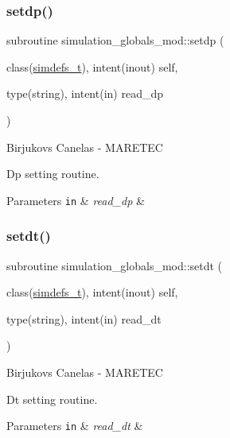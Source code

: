 \subsubsection{\texorpdfstring{setdp()}{setdp()}}
{\footnotesize\ttfamily subroutine simulation\+\_\+globals\+\_\+mod\+::setdp (\begin{DoxyParamCaption}\item[{class(\hyperlink{structsimulation__globals__mod_1_1simdefs__t}{simdefs\+\_\+t}), intent(inout)}]{self,  }\item[{type(string), intent(in)}]{read\+\_\+dp }\end{DoxyParamCaption})\hspace{0.3cm}{\ttfamily [private]}}



Birjukovs Canelas -\/ M\+A\+R\+E\+T\+EC 

Dp setting routine. 
\begin{DoxyParams}[1]{Parameters}
\mbox{\tt in}  & {\em read\+\_\+dp} & \\
\hline
\end{DoxyParams}
\mbox{\label{namespacesimulation__globals__mod_aecf75eeccef4eeae6d10ab26cf2dcfcf}} 
\subsubsection{\texorpdfstring{setdt()}{setdt()}}
{\footnotesize\ttfamily subroutine simulation\+\_\+globals\+\_\+mod\+::setdt (\begin{DoxyParamCaption}\item[{class(\hyperlink{structsimulation__globals__mod_1_1simdefs__t}{simdefs\+\_\+t}), intent(inout)}]{self,  }\item[{type(string), intent(in)}]{read\+\_\+dt }\end{DoxyParamCaption})\hspace{0.3cm}{\ttfamily [private]}}



Birjukovs Canelas -\/ M\+A\+R\+E\+T\+EC 

Dt setting routine. 
\begin{DoxyParams}[1]{Parameters}
\mbox{\tt in}  & {\em read\+\_\+dt} & \\
\hline
\end{DoxyParams}
\mbox{\label{namespacesimulation__globals__mod_a9e92dfed4ef7388208adce768f064554}} 

